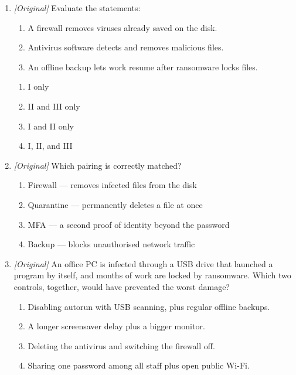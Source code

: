 \documentclass[11pt]{article}
\begin{document}
\begin{enumerate}[label=\textbf{Q\arabic*.}, leftmargin=*]
\item \textit{[Original]} Evaluate the statements:
  \begin{enumerate}[label=\Roman*.]
    \item A firewall removes viruses already saved on the disk.
    \item Antivirus software detects and removes malicious files.
    \item An offline backup lets work resume after ransomware locks files.
  \end{enumerate}
  \begin{enumerate}[label=\Alph*.]
    \item I only
    \item II and III only
    \item I and II only
    \item I, II, and III
  \end{enumerate}
\item \textit{[Original]} Which pairing is correctly matched?
  \begin{enumerate}[label=\Alph*.]
    \item Firewall --- removes infected files from the disk
    \item Quarantine --- permanently deletes a file at once
    \item MFA --- a second proof of identity beyond the password
    \item Backup --- blocks unauthorised network traffic
  \end{enumerate}
\item \textit{[Original]} An office PC is infected through a USB drive that
  launched a program by itself, and months of work are locked by ransomware.
  Which two controls, together, would have prevented the worst damage?
  \begin{enumerate}[label=\Alph*.]
    \item Disabling autorun with USB scanning, plus regular offline backups.
    \item A longer screensaver delay plus a bigger monitor.
    \item Deleting the antivirus and switching the firewall off.
    \item Sharing one password among all staff plus open public Wi-Fi.
  \end{enumerate}


\end{enumerate}
\end{document}

